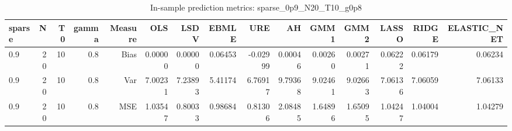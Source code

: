 \begin{table}[!htbp]\centering
\caption{In-sample prediction metrics: sparse_0p9_N20_T10_g0p8}
\label{tab:table2_sparse_0p9_N20_T10_g0p8}
\begin{tabular}{lrrrrrrrrrrrrrr}
\hline
sparse & N & T0 & gamma & Measure & OLS & LSDV & EBMLE & URE & AH & GMM1 & GMM2 & LASSO & RIDGE & ELASTIC_NET \\
\hline
0.9 & 20 & 10 & 0.8 & Bias & 0.00000 & 0.00000 & 0.06453 & -0.02999 & 0.00046 & 0.00260 & 0.00271 & 0.06222 & 0.06179 & 0.06234 \\
0.9 & 20 & 10 & 0.8 & Var & 7.00231 & 7.23893 & 5.41174 & 6.76917 & 9.79368 & 9.02461 & 9.02663 & 7.06136 & 7.06059 & 7.06133 \\
0.9 & 20 & 10 & 0.8 & MSE & 1.03547 & 0.80033 & 0.98684 & 0.81306 & 2.08485 & 1.64896 & 1.65095 & 1.04247 & 1.04004 & 1.04279 \\
\hline
\end{tabular}
\end{table}

